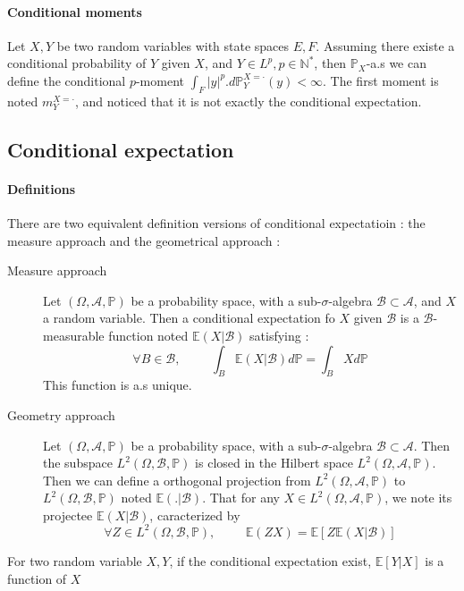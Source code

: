 \documentclass[a4paper,10pt]{article}
\begin{document}
\paragraph{Conditional moments} Let $X,Y$ be two random variables with state spaces $E,F$. Assuming there existe a conditional probability of $Y$ given $X$, and $Y \in L^p , p \in \mathbb{N}^*$, then $\mathbb{P}_X$-a.s we can define the conditional $p$-moment $\int_F |y|^p.  d\mathbb{P}^{X=\cdot}_Y(y)<\infty$. The first moment is noted $m^{X=\cdot}_Y$, and noticed that it is not exactly the conditional expectation. 


\subsection{Conditional expectation}
\paragraph{Definitions } There are two equivalent definition versions of conditional expectatioin : the measure approach and the geometrical approach :
\begin{description}
 \item [Measure approach] Let $(\Omega, \mathcal{A}, \mathbb{P})$ be a probability space, with a sub-$\sigma$-algebra $\mathcal{B} \subset \mathcal{A}$, and $X$ a random variable. Then a conditional expectation fo $X$ given $\mathcal{B}$ is a $\mathcal{B}$-measurable function noted $\mathbb{E}(X|\mathcal{B})$ satisfying :
 \[
  \forall B \in \mathcal{B}, \hspace{1cm}  \int_B \mathbb{E}(X|\mathcal{B}) d\mathbb{P} = \int_B Xd\mathbb{P}
 \]
 This function is a.s unique. 
 \item [Geometry approach]Let $(\Omega, \mathcal{A}, \mathbb{P})$ be a probability space, with a sub-$\sigma$-algebra $\mathcal{B} \subset \mathcal{A}$. Then the subspace $L^2(\Omega, \mathcal{B}, \mathbb{P})$ is closed in the Hilbert space $L^2(\Omega, \mathcal{A}, \mathbb{P})$. Then we can define a orthogonal projection from $L^2(\Omega, \mathcal{A}, \mathbb{P})$ to  $L^2(\Omega, \mathcal{B}, \mathbb{P})$ noted $\mathbb{E}(.|\mathcal{B})$. That for any $X \in L^2(\Omega, \mathcal{A}, \mathbb{P})$, we note its projectee $\mathbb{E}(X|\mathcal{B})$, caracterized by 
 \[
 \forall Z \in L^2(\Omega, \mathcal{B}, \mathbb{P}), \hspace{1cm}  \mathbb{E}(ZX) = \mathbb{E}[Z\mathbb{E}(X|\mathcal{B})]
 \] 
\end{description}
For two random variable $X,Y$, if the conditional expectation exist, $\mathbb{E}[Y|X]$ is a function of $X$
\end{document}
